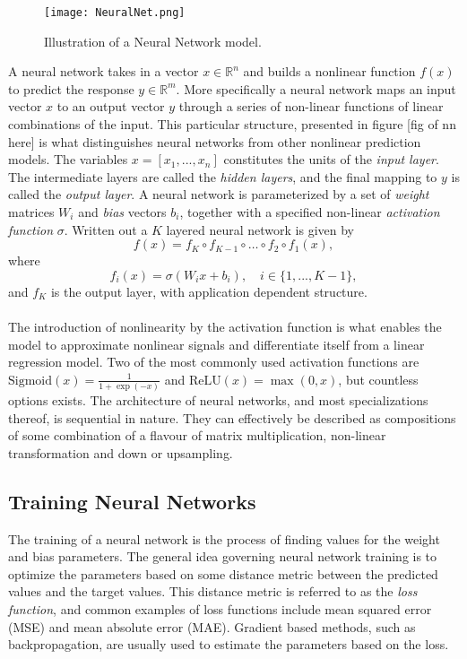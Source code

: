 \documentclass[../../thesis.tex]{subfiles}
\begin{document}
\begin{figure}
    \texttt{[image: NeuralNet.png]}
    \centering 
    \caption{Illustration of a Neural Network model.}
    \label{fig:NeuralNet}
\end{figure}

A neural network takes in a vector $x \in \mathbb{R}^n$ and builds a nonlinear function $f(x)$ to predict the response $y\in \mathbb{R}^m$. More specifically a neural network maps an input vector $x$ to an output vector $y$ through a series of non-linear functions of linear combinations of the input. This particular structure, presented in figure [fig of nn here] is what distinguishes neural networks from other nonlinear prediction models. The variables $x = [x_1,...,x_n]$ constitutes the units of the \textit{input layer}. The intermediate layers are called the \textit{hidden layers}, and the final mapping to $y$ is called the \textit{output layer}. A neural network is parameterized by a set of \textit{weight} matrices $W_i$ and \textit{bias} vectors $b_i$, together with a specified non-linear \textit{activation function} $\sigma$. Written out a $K$ layered neural network is given by 
\[ 
f(x) = f_K \circ f_{K-1} \circ \ldots \circ f_2 \circ f_1(x),
\]
where 
$$f_i(x) = \sigma(W_ix+b_i), \quad i \in \{1,...,K-1\},$$ 
and $f_K$ is the output layer, with application dependent structure.\\\\ 

The introduction of nonlinearity by the activation function is what enables the model to approximate nonlinear signals and differentiate itself from a linear regression model. Two of the most commonly used activation functions are $\text{Sigmoid}(x) = \tfrac{1}{1+\exp(-x)}$ and $\text{ReLU}(x) = \max(0,x)$, but countless options exists.\newline
The architecture of neural networks, and most specializations thereof, is sequential in nature. They can effectively be described as compositions of some combination of a flavour of matrix multiplication, non-linear transformation and down or upsampling. 

\subsection{Training Neural Networks}

The training of a neural network is the process of finding values for the weight and bias parameters. The general idea governing neural network training is to optimize the parameters based on some distance metric between the predicted values and the target values. This distance metric is referred to as the \textit{loss function}, and common examples of loss functions include mean squared error (MSE) and mean absolute error (MAE). Gradient based methods, such as backpropagation, are usually used to estimate the parameters based on the loss.\newline
\end{document}
